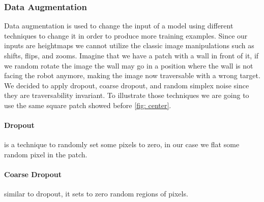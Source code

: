 \documentclass[../document.tex]{subfiles}
\begin{document}
\subsubsection{Data Augmentation}
\label{sec: data-aug}
Data augmentation is used to change the input of a model using different techniques to change it in order to produce more training examples. Since our inputs are heightmaps we cannot utilize the classic image manipulations such as shifts, flips, and zooms. Imagine that we have a patch with a wall in front of it, if we random rotate the image the wall may go in a position where the wall is not facing the robot anymore, making the image now traversable with a wrong target. We decided to apply dropout, coarse dropout, and random simplex noise since they are traversability invariant. To illustrate those techniques we are going to use the same square patch showed before \ref{fig: center}.

\paragraph{Dropout} is a technique to randomly set some pixels to zero, in our case we flat some random pixel in the patch. 
\paragraph{Coarse Dropout} similar to dropout, it sets to zero random regions of pixels.
\end{document}
